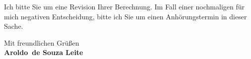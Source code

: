 \documentclass[12pt,a4paper]{article}
\def\firstname{Aroldo}
\def\familyname{de Souza Leite}
\begin{document}
Ich bitte Sie um eine Revision Ihrer Berechnung. Im Fall einer nochmaligen für mich negativen Entscheidung, bitte ich Sie um einen Anhörungstermin in dieser Sache.


Mit freundlichen Grüßen\\[2.5em] %



%
{\bfseries \firstname~\familyname}\\
%

\thispagestyle{empty}
\end{document}
